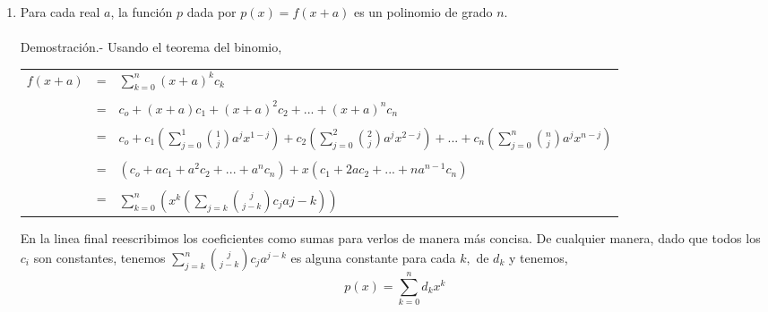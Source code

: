 \begin{enumerate}
\begin{enumerate}[\bfseries (a)]
                \item Para cada real $a$, la función $p$ dada por $p(x)=f(x+a)$ es un polinomio de grado $n.$\\\\
                Demostración.- \; Usando el teorema del binomio,
                    \begin{center}
                        \begin{tabular}{r c l}
                            $f(x+a)$&=&$ \displaystyle\sum_{k=0}^{n} (x+a)^k c_k$\\\\
                            &=&$c_o + (x+a)c_1 + (x+a)^2 c_2 + ...+(x+a)^n c_n$\\\\
                            &=&$ c_o + c_1 \left( \displaystyle\sum_{j=0}^{1} {1 \choose j} a^j x^{1-j} \right) + c_2 \left( \displaystyle\sum_{j=0}^2 {2 \choose j} a^j x^{2-j} \right) 
                            + ... + c_n \left( \displaystyle\sum_{j=0}^{n} {n \choose j} a^j x^{n-j} \right)$\\\\
                            &=&$(c_o + ac_1 + a^2 c_2 + ... + a^n c_n) + x(c_1 + 2ac_2 + ... + na^{n-1} c_n)$\\\\
                            &=&$\displaystyle\sum_{k=0}^n \left( x^k \left( \displaystyle\sum_{j=k} {j \choose j-k} c_j a{j-k}\right) \right)$\\
                        \end{tabular}
                    \end{center}
                En la linea final reescribimos los coeficientes como sumas para verlos de manera más concisa. De cualquier manera, dado que todos los $c_i$ son constantes, tenemos $\displaystyle\sum_{j=k}^n {j \choose j-k} c_j a^{j-k}$ es alguna constante para cada $k,$ de $d_k$ y tenemos, $$p(x) = \displaystyle\sum_{k=0}^n d_k x^k$$\\\\


\end{enumerate}
\end{enumerate}
